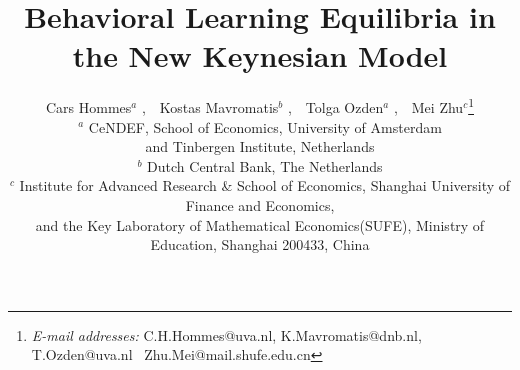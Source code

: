 \documentclass[12pt]{article}
\numberwithin{equation}{section}
\begin{document}
\title{Behavioral Learning Equilibria in the New Keynesian Model}
\author{Cars Hommes$^{a}$ , \,\, Kostas Mavromatis$^{b}$ , \,\, Tolga Ozden$^{a}$ , \,\, Mei Zhu$^{c}$\footnote{\indent\emph{E-mail addresses:} {C.H.Hommes@uva.nl, K.Mavromatis@dnb.nl, T.Ozden@uva.nl \,\,\,Zhu.Mei@mail.shufe.edu.cn}}\\
{\footnotesize $^{a}$ CeNDEF, School of Economics, University of Amsterdam}\\
{\footnotesize  and Tinbergen Institute, Netherlands} \\
{\footnotesize $^{b}$ Dutch Central Bank, The Netherlands}\\
{\footnotesize  $^{c}$ Institute for Advanced Research \& School of Economics, Shanghai University of Finance and Economics,} \\
{\footnotesize and the Key Laboratory of Mathematical
Economics(SUFE), Ministry of Education, Shanghai 200433, China}}

\end{document}
